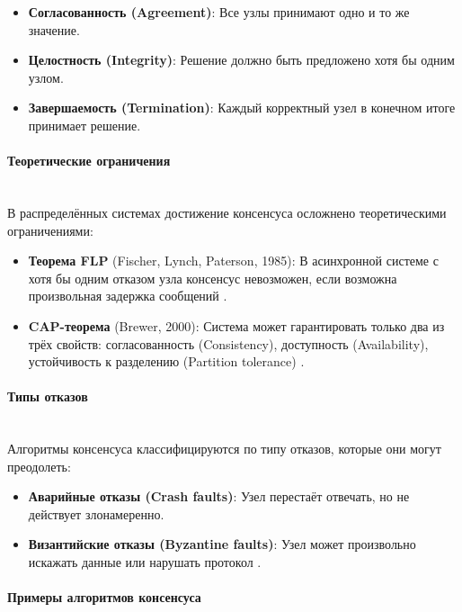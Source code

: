 \begin{itemize} 
    \item \textbf{Согласованность (Agreement)}: Все узлы принимают одно и то же значение. 
    \item \textbf{Целостность (Integrity)}: Решение должно быть предложено хотя бы одним узлом. 
    \item \textbf{Завершаемость (Termination)}: Каждый корректный узел в конечном итоге принимает решение. 
\end{itemize}

\paragraph{Теоретические ограничения}~\\ 

В распределённых системах достижение консенсуса осложнено теоретическими ограничениями: 

\begin{itemize} 
    \item \textbf{Теорема FLP} (Fischer, Lynch, Paterson, 1985): В асинхронной системе с хотя бы одним отказом узла консенсус невозможен, если возможна произвольная задержка сообщений \autocite{Fischer1985}. 
    \item \textbf{CAP-теорема} (Brewer, 2000): Система может гарантировать только два из трёх свойств: согласованность (Consistency), доступность (Availability), устойчивость к разделению (Partition tolerance) \autocite{Brewer2012}. 
\end{itemize}

\paragraph{Типы отказов}~\\ 

Алгоритмы консенсуса классифицируются по типу отказов, которые они могут преодолеть: 

\begin{itemize} 
    \item \textbf{Аварийные отказы (Crash faults)}: Узел перестаёт отвечать, но не действует злонамеренно. 
    \item \textbf{Византийские отказы (Byzantine faults)}: Узел может произвольно искажать данные или нарушать протокол \autocite{Castro1999}. 
\end{itemize}

\paragraph{Примеры алгоритмов консенсуса}~\\ 

